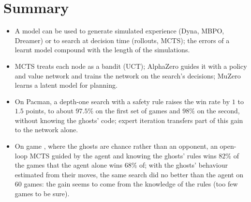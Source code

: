 \section{Summary}

\begin{itemize}[nosep]
  \item A model can be used to generate simulated experience (Dyna, MBPO,
    Dreamer) or to search at decision time (rollouts, MCTS); the errors of
    a learnt model compound with the length of the simulations.
  \item MCTS treats each node as a bandit (UCT); AlphaZero guides it with a
    policy and value network and trains the network on the search's
    decisions; MuZero learns a latent model for planning.
  \item On Pacman, a depth-one search with a safety rule raises the win
    rate by $1$ to $1.5$ points, to about $97.5\%$ on the first set of games
    and $98\%$ on the second, without knowing the ghosts' code;
    expert iteration transfers part of this gain to the network alone.
  \item On game , where the ghosts are chance rather than an
    opponent, an open-loop MCTS guided by the agent and knowing the ghosts'
    rules wins $82\%$ of the games that the agent alone wins $68\%$ of; with
    the ghosts' behaviour estimated from their moves, the same search did
    no better than the agent on $60$ games: the gain seems to come from the
    knowledge of the rules (too few games to be sure).
\end{itemize}
